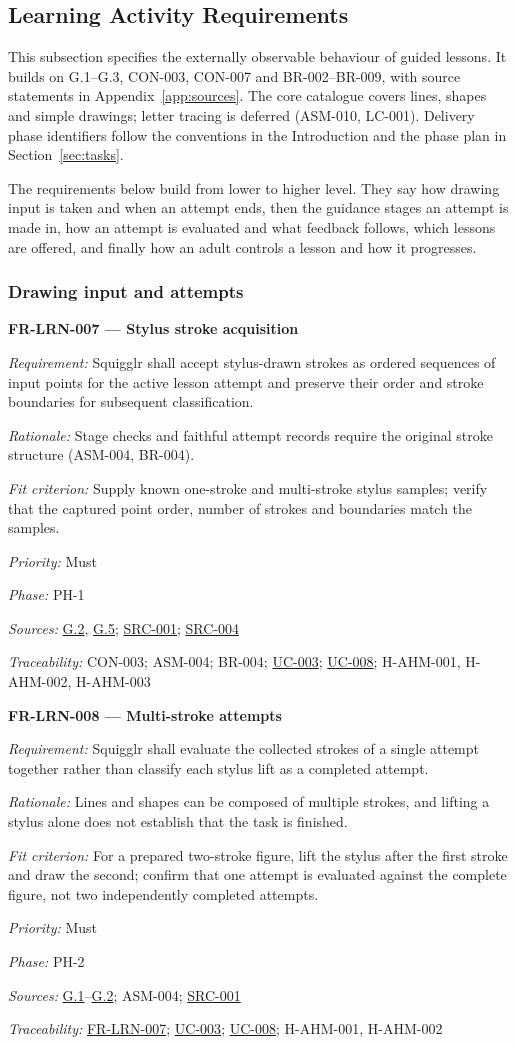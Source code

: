 \documentclass[12pt]{article}
\renewcommand{\_}{\textunderscore\allowbreak}%
\newcommand{\goalref}[1]{\hyperref[goal:#1]{G.#1}}
\newcommand{\ucref}[1]{\hyperref[uc:#1]{\mbox{UC-#1}}}
\newenvironment{srsrequirement}[2]{%
  \par\medskip\noindent\phantomsection\label{req:#1}%
  \textbf{#1 --- #2}\par\nobreak\smallskip }{\par\medskip}
\newcommand{\reqfield}[2]{\noindent\textit{#1:} #2\par}
\newcommand{\reqshall}[1]{\reqfield{Requirement}{#1}}
\newcommand{\reqrationale}[1]{\reqfield{Rationale}{#1}}
\newcommand{\reqfit}[1]{\reqfield{Fit criterion}{#1}}
\newcommand{\reqpriority}[1]{\reqfield{Priority}{#1}}
\newcommand{\reqphase}[1]{\reqfield{Phase}{#1}}
\newcommand{\reqsources}[1]{\reqfield{Sources}{#1}}
\newcommand{\reqtraces}[1]{\reqfield{Traceability}{#1}}
\newcommand{\reqref}[1]{\hyperref[req:#1]{#1}}
\newcommand{\srcref}[1]{\hyperref[src:#1]{SRC-#1}}
\providecommand{\ucref}[1]{\hyperref[uc:#1]{UC-#1}}
\begin{document}
\subsection{Learning Activity Requirements}
\label{sec:fr-learning}

This subsection specifies the externally observable behaviour of guided lessons.
It builds on G.1--G.3, CON-003, CON-007 and BR-002--BR-009, with source
statements in Appendix~\ref{app:sources}. The core catalogue covers lines,
shapes and simple drawings; letter tracing is deferred (ASM-010, LC-001).
Delivery phase identifiers follow the conventions in the Introduction and the
phase plan in Section~\ref{sec:tasks}.

The requirements below build from lower to higher level. They say how drawing
input is taken and when an attempt ends, then the guidance stages an attempt is
made in, how an attempt is evaluated and what feedback follows, which lessons
are offered, and finally how an adult controls a lesson and how it progresses.

\subsubsection{Drawing input and attempts}
\begin{srsrequirement}{FR-LRN-007}{Stylus stroke acquisition}
  \reqshall{Squigglr shall accept stylus-drawn strokes as ordered sequences of
input points for the active lesson attempt and preserve their order and stroke
boundaries for subsequent classification.} \reqrationale{Stage checks and
faithful attempt records require the original stroke structure (ASM-004,
BR-004).} \reqfit{Supply known one-stroke and multi-stroke stylus samples;
verify that the captured point order, number of strokes and boundaries match the
samples.}
  \reqpriority{Must}
  \reqphase{PH-1}
  \reqsources{\goalref{2}, \goalref{5}; \srcref{001}; \srcref{004}}
  \reqtraces{CON-003; ASM-004; BR-004; \ucref{003}; \ucref{008}; H-AHM-001,
  H-AHM-002, H-AHM-003}
\end{srsrequirement}

\begin{srsrequirement}{FR-LRN-008}{Multi-stroke attempts}
  \reqshall{Squigglr shall evaluate the collected strokes of a single attempt
together rather than classify each stylus lift as a completed attempt.}
\reqrationale{Lines and shapes can be composed of multiple strokes, and lifting
a stylus alone does not establish that the task is finished.} \reqfit{For a
prepared two-stroke figure, lift the stylus after the first stroke and draw the
second; confirm that one attempt is evaluated against the complete figure, not
two independently completed attempts.}
  \reqpriority{Must}
  \reqphase{PH-2}
  \reqsources{\goalref{1}--\goalref{2}; ASM-004; \srcref{001}}
  \reqtraces{\reqref{FR-LRN-007}; \ucref{003}; \ucref{008}; H-AHM-001,
  H-AHM-002}
\end{srsrequirement}
\end{document}
